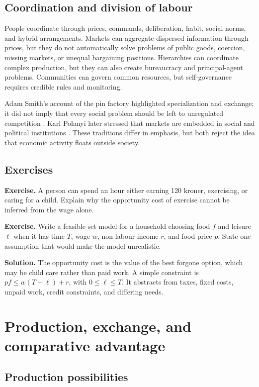 \documentclass[11pt,oneside,openany]{book}
\newcommand{\exercise}[1]{\textbf{Exercise.} #1}
\newcommand{\solution}[1]{\textbf{Solution.} #1}
\begin{document}
\section{Coordination and division of labour}

People coordinate through prices, commands, deliberation, habit, social norms, and hybrid arrangements. Markets can aggregate dispersed information through prices, but they do not automatically solve problems of public goods, coercion, missing markets, or unequal bargaining positions. Hierarchies can coordinate complex production, but they can also create bureaucracy and principal-agent problems. Communities can govern common resources, but self-governance requires credible rules and monitoring.

Adam Smith's account of the pin factory highlighted specialization and exchange; it did not imply that every social problem should be left to unregulated competition \cite{smith1776}. Karl Polanyi later stressed that markets are embedded in social and political institutions \cite{polanyi1944}. These traditions differ in emphasis, but both reject the idea that economic activity floats outside society.

\section{Exercises}

\exercise{A person can spend an hour either earning 120 kroner, exercising, or caring for a child. Explain why the opportunity cost of exercise cannot be inferred from the wage alone.}

\exercise{Write a feasible-set model for a household choosing food $f$ and leisure $\ell$ when it has time $T$, wage $w$, non-labour income $r$, and food price $p$. State one assumption that would make the model unrealistic.}

\solution{The opportunity cost is the value of the best forgone option, which may be child care rather than paid work. A simple constraint is $pf\leq w(T-\ell)+r$, with $0\leq\ell\leq T$. It abstracts from taxes, fixed costs, unpaid work, credit constraints, and differing needs.}

\chapter{Production, exchange, and comparative advantage}
\label{ch:exchange}

\section{Production possibilities}
\end{document}
